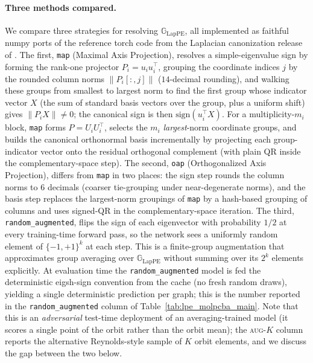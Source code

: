 \documentclass{article}
\theoremstyle{definition}
\theoremstyle{plain}
\newcommand{\G}{\mathbb{G}}
\begin{document}
\paragraph{Three methods compared.}
We compare three strategies for resolving $\G_{\mathrm{LapPE}}$, all
implemented as faithful numpy ports of the reference torch code from
the Laplacian canonization release of \cite{ma2023laplacian}.
The first, \texttt{map} (Maximal Axis Projection), resolves a
simple-eigenvalue sign by forming the rank-one projector
$P_i = u_i u_i^{\top}$, grouping the coordinate indices $j$ by the
rounded column norms $\|P_i[:,j]\|$ ($14$-decimal rounding), and
walking these groups from smallest to largest norm to find the first
group whose indicator vector $X$ (the sum of standard basis vectors
over the group, plus a uniform shift) gives $\|P_i X\|\!\neq\!0$; the
canonical sign is then $\mathrm{sign}(u_i^{\top}X)$. For a
multiplicity-$m_i$ block, \texttt{map} forms $P = U_i U_i^{\top}$,
selects the $m_i$ \emph{largest}-norm coordinate groups, and builds
the canonical orthonormal basis incrementally by projecting each
group-indicator vector onto the residual orthogonal complement
(with plain QR inside the complementary-space step).
The second, \texttt{oap} (Orthogonalized Axis Projection), differs
from \texttt{map} in two places: the sign step rounds the column
norms to $6$ decimals (coarser tie-grouping under near-degenerate
norms), and the basis step replaces the largest-norm groupings of
\texttt{map} by a hash-based grouping of columns and uses signed-QR
in the complementary-space iteration.
The third, \texttt{random\_augmented}, flips the sign of each
eigenvector with probability $1/2$ at every training-time forward
pass, so the network sees a uniformly random element of
$\{-1,+1\}^{k}$ at each step. This is a finite-group augmentation
that approximates group averaging over $\G_{\mathrm{LapPE}}$ without
summing over its $2^{k}$ elements explicitly. At evaluation time the
\texttt{random\_augmented} model is fed the deterministic eigsh-sign
convention from the cache (no fresh random draws), yielding a single
deterministic prediction per graph; this is the number reported in
the \texttt{random\_augmented} column of
Table~\ref{tab:lpe_molpcba_main}. Note that this is an
\emph{adversarial} test-time deployment of an averaging-trained model
(it scores a single point of the orbit rather than the orbit mean);
the \textsc{aug-$K$} column reports the alternative Reynolds-style
sample of $K$ orbit elements, and we discuss the gap between the
two below.
\end{document}
